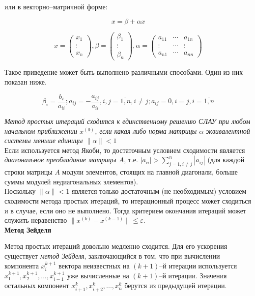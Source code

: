 или в векторно--матричной форме:

$$
x=\beta + \alpha x
$$

$$
x=\begin{pmatrix}
x_1\\
\vdots\\
x_n
\end{pmatrix},
\beta=\begin{pmatrix}
\beta_1\\
\vdots\\
\beta_n
\end{pmatrix},
\alpha=\begin{pmatrix}
a_{11} & \cdots & a_{1n}\\
\vdots & \cdots & \vdots\\
a_{n1} & \cdots & a_{nn}
\end{pmatrix}
$$

Такое приведение может быть выполнено различными способами. Один из них показан ниже.

$$
\beta_i=\frac{b_i}{a_{ii}}; a_{ij}=-\frac{a_{ij}}{a_{ii}}, i,j=\overline{1,n}, i \neq j; a_{ij}=0, i=j, i=\overline{1,n}
$$

\textit{Метод простых итераций сходится к единственному решению СЛАУ при любом начальном приближении $x^{(0)}$, если какая-либо норма матрицы $\alpha$ эквивалентной системы меньше единицы $\| \alpha \| < 1$}\\

Если используется метод Якоби, то достаточным условием сходимости является \textit{диагональное преобладание матрицы $A$}, т.е. $|a_{ii}|>\sum\limits_{j=1,i \neq j}^n|a_{ij}|$ (для каждой строки матрицы $A$ модули элементов, стоящих на главной диагонали, больше суммы модулей недиагональных элементов).\\

Поскольку $\| \alpha \| < 1$ является только достаточным (не необходимым) условием сходимости метода простых итераций, то итерационный процесс может сходиться и в случае, если оно не выполнено. Тогда критерием окончания итераций может служить неравенство $\|x^{(k)}-x^{(k-1)}\| \leq \varepsilon$.\\

\textbf{Метод Зейделя}

Метод простых итераций довольно медленно сходится. Для его ускорения существует \textit{метод Зейделя}, заключающийся в том, что при вычислении компонента $x_i^{k+1}$ вектора неизвестных на $(k+1)$--й итерации используется $x_1^{k+1}, x_2^{k+1}, ..., x_{i-1}^{k+1}$ уже вычисленные на $(k+1)$--й итерации. Значения остальных компонент $x_{i+1}^{k}, x_{i+2}^{k}, ..., x_{n}^{k}$ берутся из предыдущей итерации.\\

